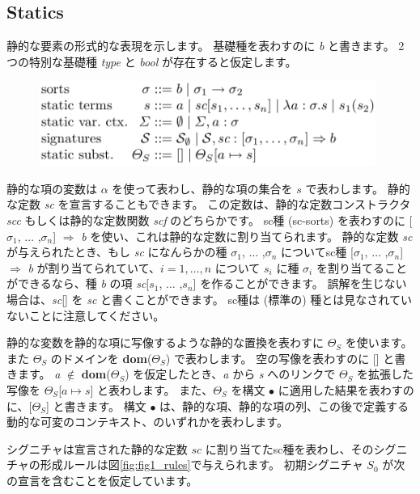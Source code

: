 \documentclass[submit,techreq,noauthor,onecolumn]{ipsj}
\begin{document}
\subsection{Statics}

静的な要素の形式的な表現を示します。
基礎種を表わすのに {\it b} と書きます。
2つの特別な基礎種 {\it type} と {\it bool} が存在すると仮定します。

\begin{figure}[h]
\centering
\includegraphics[width=11cm]{img/infig21_formaldesc.png}
\end{figure}

静的な項の変数は $\alpha$ を使って表わし、静的な項の集合を $s$ で表わします。
静的な定数 {\it sc} を宣言することもできます。
この定数は、静的な定数コンストラクタ {\it scc} もしくは静的な定数関数 {\it scf} のどちらかです。
sc種 (sc-sorts) を表わすのに [$\sigma_1$, $\ldots$ ,$\sigma_n$] $\Rightarrow$ {\it b} を使い、これは静的な定数に割り当てられます。
静的な定数 {\it sc} が与えられたとき、もし {\it sc} になんらかの種 $\sigma_1$, $\ldots$ ,$\sigma_n$ についてsc種 [$\sigma_1$, $\ldots$ ,$\sigma_n$] $\Rightarrow$ {\it b} が割り当てられていて、$i = 1, \ldots ,n$ について $s_i$ に種 $\sigma_i$ を割り当てることができるなら、種 {\it b} の項 {\it sc}[$s_1$, $\ldots$ ,$s_n$] を作ることができます。
誤解を生じない場合は、{\it sc}[] を {\it sc} と書くことができます。
sc種は (標準の) 種とは見なされていないことに注意してください。

静的な変数を静的な項に写像するような静的な置換を表わすに $\Theta_S$ を使います。
また $\Theta_S$ のドメインを {\bf dom}($\Theta_S$) で表わします。
空の写像を表わすのに [] と書きます。
{\it a} $\notin$ {\bf dom}($\Theta_S$) を仮定したとき、{\it a} から {\it s} へのリンクで $\Theta_S$ を拡張した写像を $\Theta_S$[$a \mapsto s$] と表わします。
また、$\Theta_S$ を構文 $\bullet$ に適用した結果を表わすのに、[$\Theta_S$] と書きます。
構文 $\bullet$ は、静的な項、静的な項の列、この後で定義する動的な可変のコンテキスト、のいずれかを表わします。

シグニチャは宣言された静的な定数 $sc$ に割り当てたsc種を表わし、そのシグニチャの形成ルールは図\ref{fig:fig1_rules}で与えられます。
初期シグニチャ $S_0$ が次の宣言を含むことを仮定しています。
\end{document}
